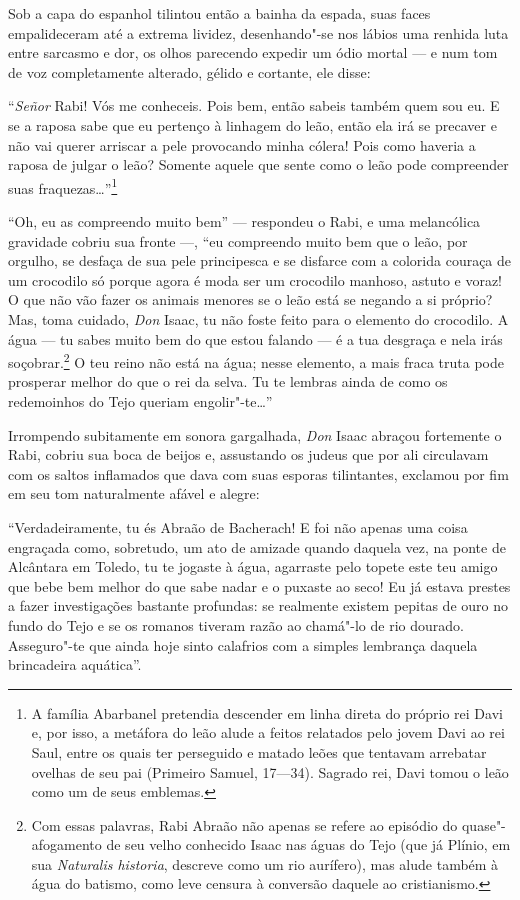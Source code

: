 Sob a capa do espanhol tilintou então a bainha da espada, suas faces
empalideceram até a extrema lividez, desenhando"-se nos lábios uma
renhida luta entre sarcasmo e dor, os olhos parecendo expedir um ódio
mortal --- e num tom de voz completamente alterado, gélido e cortante,
ele disse:

``\textit{Señor} Rabi! Vós me conheceis. Pois bem, então sabeis também
quem sou eu. E se a raposa sabe que eu pertenço à linhagem do leão,
então ela irá se precaver e não vai querer arriscar a pele provocando
minha cólera! Pois como haveria a raposa de julgar o leão? Somente
aquele que sente como o leão pode compreender suas
fraquezas\ldots''\footnote{ A família Abarbanel pretendia descender em 
linha direta do próprio rei Davi e, por isso, a metáfora do leão alude 
a feitos relatados pelo jovem Davi ao rei Saul, entre os quais ter perseguido e matado leões
que tentavam arrebatar ovelhas de seu pai (Primeiro Samuel, 17---34).
Sagrado rei, Davi tomou o leão como um de seus emblemas.}


``Oh, eu as compreendo muito bem'' --- respondeu o Rabi, e uma melancólica
gravidade cobriu sua fronte ---, ``eu compreendo muito bem que o leão, por
orgulho, se desfaça de sua pele principesca e se disfarce com a
colorida couraça de um crocodilo só porque agora é moda ser um
crocodilo manhoso, astuto e voraz! O que não vão fazer os animais
menores se o leão está se negando a si próprio? Mas, toma cuidado,
\textit{Don }Isaac, tu não foste feito para o elemento do crocodilo. A
água --- tu sabes muito bem do que estou falando --- é a tua desgraça e
nela irás
soçobrar.\footnote{ Com
essas palavras, Rabi Abraão não apenas se refere ao episódio do
quase"-afogamento de seu velho conhecido Isaac nas águas do Tejo (que
já Plínio, em sua \textit{Naturalis historia}, descreve como um rio
aurífero), mas alude também à água do batismo, como leve censura à
conversão daquele ao cristianismo.}
 O teu reino não está na água; nesse elemento, a mais fraca truta pode
prosperar melhor do que o rei da selva. Tu te lembras ainda de como os
redemoinhos do Tejo queriam engolir"-te\ldots''

Irrompendo subitamente em sonora gargalhada, \textit{Don} Isaac abraçou
fortemente o Rabi, cobriu sua boca de beijos e, assustando os judeus
que por ali circulavam com os saltos inflamados que dava com suas
esporas tilintantes, exclamou por fim em seu tom naturalmente afável e
alegre:

``Verdadeiramente, tu és Abraão de Bacherach! E foi não apenas uma coisa
engraçada como, sobretudo, um ato de amizade quando daquela vez, na
ponte de Alcântara em Toledo, tu te jogaste à água, agarraste pelo
topete este teu amigo que bebe bem melhor do que sabe nadar e o puxaste
ao seco! Eu já estava prestes a fazer investigações bastante profundas:
se realmente existem pepitas de ouro no fundo do Tejo e se os romanos
tiveram razão ao chamá"-lo de rio dourado. Asseguro"-te que ainda
hoje sinto calafrios com a simples lembrança daquela brincadeira
aquática''.

